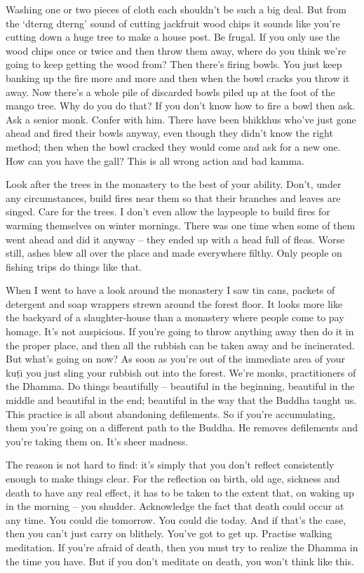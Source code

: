Washing one or two pieces of cloth each shouldn't be such a big deal. But from the `dterng dterng' sound of cutting jackfruit wood chips it sounds like you're cutting down a huge tree to make a house post. Be frugal. If you only use the wood chips once or twice and then throw them away, where do you think we're going to keep getting the wood from? Then there's firing bowls. You just keep banking up the fire more and more and then when the bowl cracks you throw it away. Now there's a whole pile of discarded bowls piled up at the foot of the mango tree. Why do you do that? If you don't know how to fire a bowl then ask. Ask a senior monk. Confer with him. There have been bhikkhus who've just gone ahead and fired their bowls anyway, even though they didn't know the right method; then when the bowl cracked they would come and ask for a new one. How can you have the gall? This is all wrong action and bad kamma.

Look after the trees in the monastery to the best of your ability. Don't, under any circumstances, build fires near them so that their branches and leaves are singed. Care for the trees. I don't even allow the laypeople to build fires for warming themselves on winter mornings. There was one time when some of them went ahead and did it anyway -- they ended up with a head full of fleas. Worse still, ashes blew all over the place and made everywhere filthy. Only people on fishing trips do things like that.

When I went to have a look around the monastery I saw tin cans, packets of detergent and soap wrappers strewn around the forest floor. It looks more like the backyard of a slaughter-house than a monastery where people come to pay homage. It's not auspicious. If you're going to throw anything away then do it in the proper place, and then all the rubbish can be taken away and be incinerated. But what's going on now? As soon as you're out of the immediate area of your ku\d{t}\={\i} you just sling your rubbish out into the forest. We're monks, practitioners of the Dhamma. Do things beautifully -- beautiful in the beginning, beautiful in the middle and beautiful in the end; beautiful in the way that the Buddha taught us. This practice is all about abandoning defilements. So if you're accumulating, them you're going on a different path to the Buddha. He removes defilements and you're taking them on. It's sheer madness.

The reason is not hard to find: it's simply that you don't reflect consistently enough to make things clear. For the reflection on birth, old age, sickness and death to have any real effect, it has to be taken to the extent that, on waking up in the morning -- you shudder. Acknowledge the fact that death could occur at any time. You could die tomorrow. You could die today. And if that's the case, then you can't just carry on blithely. You've got to get up. Practise walking meditation. If you're afraid of death, then you must try to realize the Dhamma in the time you have. But if you don't meditate on death, you won't think like this.

